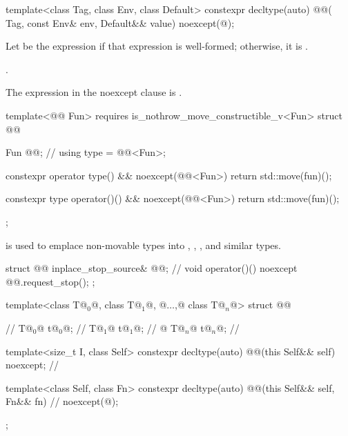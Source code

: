 \begin{itemdecl}
template<class Tag, class Env, class Default>
  constexpr decltype(auto) @@(
    Tag, const Env& env, Default&& value) noexcept(@\seebelow@);
\end{itemdecl}

\begin{itemdescr}
\pnum
Let  be the expression 
if that expression is well-formed;
otherwise, it is .

\pnum
\returns
{}.

\pnum
\remarks
The expression in the noexcept clause is .
\end{itemdescr}

\pnum
\begin{codeblock}
template<@@ Fun>
  requires is_nothrow_move_constructible_v<Fun>
struct @@ {
  Fun @@;                                                      // \expos
  using type = @@<Fun>;

  constexpr operator type() && noexcept(@@<Fun>) {
    return std::move(fun)();
  }

  constexpr type operator()() && noexcept(@@<Fun>) {
    return std::move(fun)();
  }
};
\end{codeblock}
\begin{note}
 is used to emplace non-movable types
into , , , and similar types.
\end{note}

\pnum
\begin{codeblock}
struct @@ {
  inplace_stop_source& @@;       // \expos
  void operator()() noexcept { @@.request_stop(); }
};
\end{codeblock}

\pnum
\begin{codeblock}
template<class T@$_0$@, class T@$_1$@, @$\dotsc$,@ class T@$_n$@>
struct @@ {       // \expos
  T@$_0$@ t@$_0$@;                // \expos
  T@$_1$@ t@$_1$@;                // \expos
    @\vdots@
  T@$_n$@ t@$_n$@;                // \expos

  template<size_t I, class Self>
  constexpr decltype(auto) @@(this Self&& self) noexcept;      // \expos

  template<class Self, class Fn>
  constexpr decltype(auto) @@(this Self&& self, Fn&& fn)     // \expos
    noexcept(@\seebelow@);
};
\end{codeblock}

